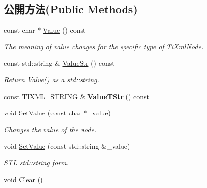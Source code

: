 \subsection*{公開方法(Public Methods)}
\begin{DoxyCompactItemize}
\item 
const char $\ast$ \hyperlink{class_ti_xml_node_a77943eb90d12c2892b1337a9f5918b41}{Value} () const 
\begin{DoxyCompactList}\small\item\em The meaning of \textquotesingle{}value\textquotesingle{} changes for the specific type of \hyperlink{class_ti_xml_node}{Ti\+Xml\+Node}. \end{DoxyCompactList}\item 
const std\+::string \& \hyperlink{class_ti_xml_node_a6d9e505619d39bf50bfd9609c9169ea5}{Value\+Str} () const 
\begin{DoxyCompactList}\small\item\em Return \hyperlink{class_ti_xml_node_a77943eb90d12c2892b1337a9f5918b41}{Value()} as a std\+::string. \end{DoxyCompactList}\item 
const T\+I\+X\+M\+L\+\_\+\+S\+T\+R\+I\+NG \& {\bfseries Value\+T\+Str} () const \hypertarget{class_ti_xml_node_a83ece13d2ea66dac66e0b21332229239}{}\label{class_ti_xml_node_a83ece13d2ea66dac66e0b21332229239}

\item 
void \hyperlink{class_ti_xml_node_a2a38329ca5d3f28f98ce932b8299ae90}{Set\+Value} (const char $\ast$\+\_\+value)
\begin{DoxyCompactList}\small\item\em Changes the value of the node. \end{DoxyCompactList}\item 
void \hyperlink{class_ti_xml_node_a2598d5f448042c1abbeae4503dd45ff2}{Set\+Value} (const std\+::string \&\+\_\+value)\hypertarget{class_ti_xml_node_a2598d5f448042c1abbeae4503dd45ff2}{}\label{class_ti_xml_node_a2598d5f448042c1abbeae4503dd45ff2}

\begin{DoxyCompactList}\small\item\em S\+TL std\+::string form. \end{DoxyCompactList}\item 
void \hyperlink{class_ti_xml_node_a708e7f953df61d4d2d12f73171550a4b}{Clear} ()\hypertarget{class_ti_xml_node_a708e7f953df61d4d2d12f73171550a4b}{}\label{class_ti_xml_node_a708e7f953df61d4d2d12f73171550a4b}


\end{DoxyCompactItemize}

